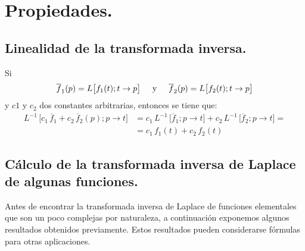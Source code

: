 \section{Propiedades.}

\subsection{Linealidad de la transformada inversa.}

Si
\begin{align*}
\overline{f}_{1} (p) = L \big[f_{1} (t); t \to p\big] \hspace{0.5cm} \mbox{y} \hspace{0.5cm} \overline{f}_{2} (p) = L \big[f_{2} (t); t \to p\big]
\end{align*}
y $c{1}$ y $c_{2}$ dos constantes arbitrarias, entonces se tiene que:
\begin{align*}
L^{-1} \, \big[ c_{1} \, \overline{f}_{1} + c_{2} \, \overline{f}_{2} (p); p \to t\big] &= c_{1} \, L^{-1} \, \big[ \overline{f}_{1}; p \to t\big] + c_{2} \, L^{-1} \, \big[ \overline{f}_{2}; p \to t\big] = \\[0.5em]
&= c_{1} \, f_{1}(t) + c_{2} \, f_{2}(t)
\end{align*}

\subsection{Cálculo de la transformada inversa de Laplace de algunas funciones.}

Antes de encontrar la transformada inversa de Laplace de funciones elementales que son un poco complejas por naturaleza, a continuación exponemos algunos resultados obtenidos previamente. Estos resultados pueden considerarse fórmulas para otras aplicaciones.

